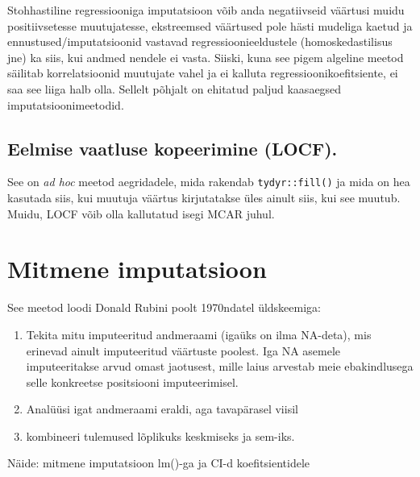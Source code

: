 \documentclass[]{book}
\begin{document}
Stohhastiline regressiooniga imputatsioon võib anda negatiivseid
väärtusi muidu positiivsetesse muutujatesse, ekstreemsed väärtused pole
hästi mudeliga kaetud ja ennustused/imputatsioonid vastavad
regressioonieeldustele (homoskedastilisus jne) ka siis, kui andmed
nendele ei vasta. Siiski, kuna see pigem algeline meetod säilitab
korrelatsioonid muutujate vahel ja ei kalluta regressioonikoefitsiente,
ei saa see liiga halb olla. Sellelt põhjalt on ehitatud paljud
kaasaegsed imputatsioonimeetodid.

\subsection{Eelmise vaatluse kopeerimine
(LOCF).}\label{eelmise-vaatluse-kopeerimine-locf.}

See on \emph{ad hoc} meetod aegridadele, mida rakendab
\texttt{tydyr::fill()} ja mida on hea kasutada siis, kui muutuja väärtus
kirjutatakse üles ainult siis, kui see muutub. Muidu, LOCF võib olla
kallutatud isegi MCAR juhul.

\section{Mitmene imputatsioon}\label{mitmene-imputatsioon}

See meetod loodi Donald Rubini poolt 1970ndatel üldskeemiga:

\begin{enumerate}
\def\labelenumi{\arabic{enumi}.}
\item
  Tekita mitu imputeeritud andmeraami (igaüks on ilma NA-deta), mis
  erinevad ainult imputeeritud väärtuste poolest. Iga NA asemele
  imputeeritakse arvud omast jaotusest, mille laius arvestab meie
  ebakindlusega selle konkreetse positsiooni imputeerimisel.
\item
  Analüüsi igat andmeraami eraldi, aga tavapärasel viisil
\item
  kombineeri tulemused lõplikuks keskmiseks ja sem-iks.
\end{enumerate}

Näide: mitmene imputatsioon lm()-ga ja CI-d koefitsientidele
\end{document}
